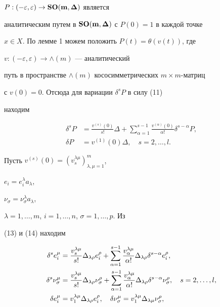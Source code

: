 $P: (-\varepsilon,\varepsilon)\to {\bold{SO(m,\boldsymbol\Delta)}}$ является


аналитическим путем в $\bold{SO(m,\boldsymbol\Delta)}$ с $P(0)= 1$ в каждой точке


$x\in X$. По лемме 1 можем положить $P(t)= \theta(v(t))$, где


$v: (-\varepsilon,\varepsilon)\to \wedge(m)$ --- аналитический


путь в пространстве $\wedge(m)$ кососимметрических $m\times m$-матриц


с $v(0)= 0$. Отсюда для вариации $\delta^sP$ в силу (11)


находим


\begin{equation}


\begin{split}


\delta^sP&=\frac{v^{(s)}(0)}{s!}\Delta+\sum_{\alpha=1}^{s-1}


\frac{v^{(\alpha)}(0)}{\alpha!}\delta^{s-\alpha}P,\\


\delta P&=v^{(1)}(0)\Delta,\quad s=2,\dotsc,l.


\end{split}


\end{equation}





Пусть $v^{(s)}(0)= (v^{\lambda\mu}_s)_{\lambda,\mu=1}^m$,


$e_i= e_i^{\lambda}a_{\lambda}$,


$\nu_{\sigma}= \nu_{\sigma}^{\lambda}a_{\lambda}$,


$\lambda= 1,\dotsc,m$, $i= 1,\dotsc,n$, $\sigma=1,\dotsc,p$. Из


(13) и (14) находим


\begin{align}


\delta^se_i^{\mu}&=\frac{v_{s}^{\lambda\mu}}{s!}\Delta_{\lambda\rho}


e_i^{\rho}+


\sum_{\alpha=1}^{s-1}\frac{v_{\alpha}^{\lambda\mu}}{\alpha!}


\Delta_{\lambda\rho}\delta^{s-\alpha}e_i^{\rho},\notag\\


\delta^s\nu_{\sigma}^{\mu}&=\frac{v_{s}^{\lambda\mu}}{s!}\Delta_{\lambda\rho}


\nu_{\sigma}^{\rho}+


\sum_{\alpha=1}^{s-1}\frac{v_{\alpha}^{\lambda\mu}}{\alpha!}


\Delta_{\lambda\rho}\delta^{s-\alpha}\nu_{\sigma}^{\rho},\quad


s=2,\dotsc,l,\\


\delta e^{\mu}_i&=v^{\lambda\mu}_1\Delta_{\lambda\rho}e^{\rho}_i,\quad


\delta\nu_{\sigma}^{\mu}=v^{\lambda\mu}_1\Delta_{\lambda\mu}


\nu^{\rho}_{\sigma},\notag


\end{align}



